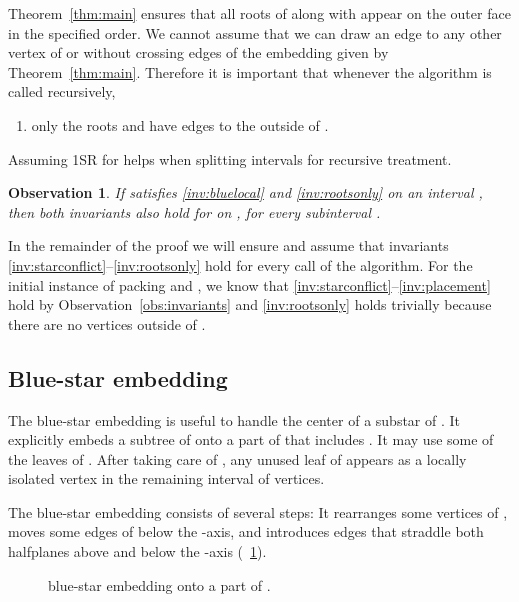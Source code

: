 \documentclass[11pt,a4paper,colorlinks=true,urlcolor=blue,citecolor=red]{article}
\theoremstyle{plain}
\newtheorem{observation}[theorem]{Observation}
\begin{document}
Theorem~\ref{thm:main} ensures that all roots of  along with 
appear on the outer face in the specified order. We cannot assume that
we can draw an edge to any other vertex of  or  without crossing
edges of the embedding given by Theorem~\ref{thm:main}. Therefore it is
important that whenever the algorithm is called recursively,
\begin{enumerate}[leftmargin=*,label={(I\arabic*)},start=4]\setlength{\itemindent}{\labelsep}
\item\label{inv:rootsonly} only the roots  and  have
  edges to the outside of .
\end{enumerate}
Assuming 1SR for  helps when splitting intervals for recursive
treatment.
\begin{observation}\label{obs:bluelocal}
  If  satisfies \ref{inv:bluelocal} and \ref{inv:rootsonly} on an
  interval , then both invariants also hold for  on ,
  for every subinterval .
\end{observation}
In the remainder of the proof we will ensure and assume that invariants
\ref{inv:starconflict}--\ref{inv:rootsonly} hold for every call of the
algorithm. For the initial instance of packing  and , we know
that \ref{inv:starconflict}--\ref{inv:placement} hold by
Observation~\ref{obs:invariants} and \ref{inv:rootsonly} holds trivially
because there are no vertices outside of .


\subsection{Blue-star embedding}
\label{sec:greedy_grab_embedding}
The blue-star embedding is useful to handle the center  of a
substar  of . It explicitly embeds a subtree  of  onto a
part of  that includes . It may use some of the leaves of
. After taking care of , any unused leaf of  appears
as a locally isolated vertex in the remaining interval of vertices.

The blue-star embedding consists of several steps:
It rearranges some vertices of , moves some edges of  below the
-axis, and introduces edges that straddle both halfplanes above and
below the -axis (\figurename~\ref{fig:greedygrabex}).
\begin{figure}[htbp]
  \centering\hfil {}\hfil
  \hfil
  \hfil
  \caption{blue-star embedding  onto a part of
    .\label{fig:greedygrabex}}
\end{figure}
\end{document}
